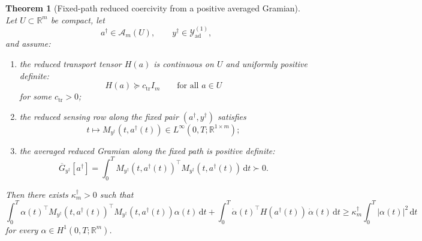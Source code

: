 \documentclass{article}
\newtheorem{theorem}{Theorem}[section]
\theoremstyle{definition}
\renewcommand{\d}{\mathrm{d}}
\begin{document}
\begin{theorem}[Fixed-path reduced coercivity from a positive averaged Gramian]
    \label{thm:local-reduced-coercivity-mobile}
    Let \(U\subset\mathbb R^m\) be compact, let
    \[
        a^\dagger\in \mathcal A_m(U),
        \qquad
        y^\dagger\in \mathcal Y_{\mathrm{ad}}^{(1)},
    \]
    and assume:
    \begin{enumerate}
        \item the reduced transport tensor \(H(a)\) is continuous on \(U\) and uniformly positive definite:
              \begin{equation}
                  \label{eq:uniform-transport-lower-bound}
                  H(a)\succeq c_{\mathrm{tr}} I_m
                  \qquad\text{for all }a\in U
              \end{equation}
              for some \(c_{\mathrm{tr}}>0\);
        \item the reduced sensing row along the fixed pair \((a^\dagger,y^\dagger)\) satisfies
              \[
                  t\longmapsto M_{y^\dagger}(t,a^\dagger(t))
                  \in L^\infty(0,T;\mathbb R^{1\times m});
              \]
        \item the averaged reduced Gramian along the fixed path is positive definite:
              \begin{equation}
                  \label{eq:positive-averaged-gramian-reference}
                  \overline G_{y^\dagger}[a^\dagger]
                  =
                  \int_0^T M_{y^\dagger}(t,a^\dagger(t))^\top
                  M_{y^\dagger}(t,a^\dagger(t))\,\d t
                  \succ 0.
              \end{equation}
    \end{enumerate}
    Then there exists \(\kappa_m^\dagger>0\) such that
    \begin{equation}
        \label{eq:fixed-path-reduced-coercivity}
        \int_0^T \alpha(t)^\top
        M_{y^\dagger}(t,a^\dagger(t))^\top
        M_{y^\dagger}(t,a^\dagger(t))
        \alpha(t)\,\d t
        +
        \int_0^T \dot\alpha(t)^\top H(a^\dagger(t))\,\dot\alpha(t)\,\d t
        \ge
        \kappa_m^\dagger \int_0^T |\alpha(t)|^2\,\d t
    \end{equation}
    for every \(\alpha\in H^1(0,T;\mathbb R^m)\).
\end{theorem}
\end{document}
